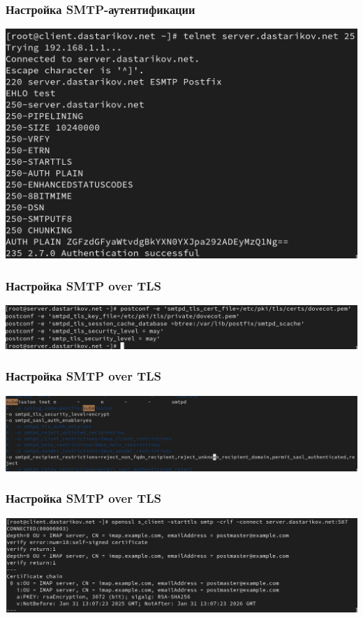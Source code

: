 \begin{frame}
  \frametitle{Настройка SMTP-аутентификации}
  \centering
  \includegraphics[width=\textwidth]{../images/image15.png}
\end{frame}


\begin{frame}
  \frametitle{Настройка SMTP over TLS}
    \centering
    \includegraphics[width=\textwidth]{../images/image16.png}
\end{frame}

\begin{frame}
  \frametitle{Настройка SMTP over TLS}
      \centering
    \includegraphics[width=\textwidth]{../images/image17.png}
\end{frame}

\begin{frame}
  \frametitle{Настройка SMTP over TLS}
    \centering
    \includegraphics[width=\textwidth]{../images/image18.png}
\end{frame}

